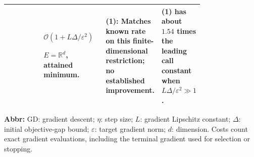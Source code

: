 \begin{table}[tp]
\begin{threeparttable}
\begin{tabularx}{\linewidth}{@{}>{\raggedright\arraybackslash}p{0.20\linewidth}>{\raggedright\arraybackslash}p{0.32\linewidth}>{\raggedright\arraybackslash}p{0.25\linewidth}>{\raggedright\arraybackslash}X@{}}
& $\mathcal{O}(1+L\Delta/\varepsilon^2)$\par $E=\mathbb R^d$, attained minimum.
& \textbf{(1)}: Matches known rate on this finite-dimensional restriction; no established improvement.
& \textbf{(1)} has about $1.54$ times the leading call constant when $L\Delta/\varepsilon^2\gg1$. \\
\bottomrule
\end{tabularx}
\begin{tablenotes}[flushleft]\footnotesize
\item[] \textbf{Abbr:} GD: gradient descent; $\eta$: step size; $L$: gradient Lipschitz constant; $\Delta$: initial objective-gap bound; $\varepsilon$: target gradient norm; $d$: dimension. Costs count exact gradient evaluations, including the terminal gradient used for selection or stopping.
\end{tablenotes}
\end{threeparttable}
\end{table}
\clearpage

